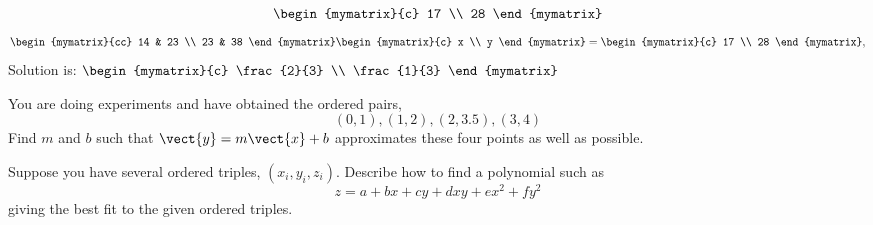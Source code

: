 \begin{ex}
\begin{sol}
\[\begin{mymatrix}{c}
17 \\
28
\end{mymatrix}
\]
\[
\begin{mymatrix}{cc}
14 & 23 \\
23 & 38
\end{mymatrix} \begin{mymatrix}{c}
x \\
y
\end{mymatrix} =\begin{mymatrix}{c}
17 \\
28
\end{mymatrix} ,
\]
Solution is: $\begin{mymatrix}{c}
\frac{2}{3} \\
\frac{1}{3}
\end{mymatrix}$
\end{sol}
\end{ex}

\begin{ex}
 You are doing experiments and have obtained the ordered pairs, 
\begin{equation*}
(0,1) ,(1,2) ,(2,3.5) ,(3,4)
\end{equation*}
Find $m$ and $b$ such that $\vect{y}=m\vect{x}+b$ approximates these four points as well
as possible. 
\end{ex}

\begin{ex}
Suppose you have several ordered triples, $(
x_{i},y_{i},z_{i})$. Describe how to find a polynomial such as  
\begin{equation*}
z=a+bx+cy+dxy+ex^{2}+fy^{2}
\end{equation*}
 giving the best fit to the given ordered triples.
\end{ex}


